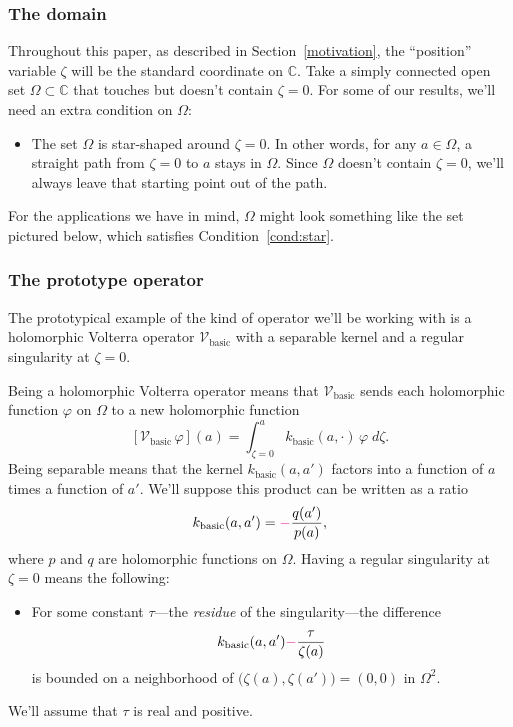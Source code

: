 \documentclass{article}
\makeatletter
\theoremstyle{plain}
\newcommand{\cond}[1]{\item[(\textsc{#1})]\protected@edef\@currentlabel{\textsc{#1}}}
\newcommand{\condconst}[2]{\item[($\text{\textsc{#1}} \mid #2$)]\protected@edef\@currentlabel{$\text{\textsc{#1}} \mid #2$}}
\newcommand{\C}{\mathbb{C}}
\newcommand{\hardpart}{\mathcal{V}_\text{basic}}
\newcommand{\hardker}{k_\text{basic}}
\newcommand{\domain}{\Omega}
\makeatother
\begin{document}
\subsubsection{The domain}\label{setting:domain}
Throughout this paper, as described in Section~\ref{motivation}, the ``position'' variable $\zeta$ will be the standard coordinate on $\C$. Take a simply connected open set $\domain \subset \C$ that touches but doesn't contain $\zeta = 0$. For some of our results, we'll need an extra condition on $\domain$:
\begin{itemize}
\cond{star}\label{cond:star} The set $\domain$ is star-shaped around $\zeta = 0$. In other words, for any $a \in \domain$, a straight path from $\zeta = 0$ to $a$ stays in $\domain$. Since $\domain$ doesn't contain $\zeta = 0$, we'll always leave that starting point out of the path.
\end{itemize}
For the applications we have in mind, $\domain$ might look something like the set pictured below, which satisfies Condition~\eqref{cond:star}.
\begin{center}
\end{center}
\subsubsection{The prototype operator}\label{setting:basic}
The prototypical example of the kind of operator we'll be working with is a holomorphic Volterra operator $\hardpart$ with a separable kernel and a regular singularity at $\zeta = 0$.

Being a holomorphic Volterra operator means that $\hardpart$ sends each holomorphic function $\varphi$ on $\domain$ to a new holomorphic function
\[ [\hardpart\,\varphi](a) = \int_{\zeta = 0}^a \hardker(a, \cdot)\,\varphi\;d\zeta. \]
Being separable means that the kernel $\hardker(a, a')$ factors into a function of $a$ times a function of $a'$. We'll suppose this product can be written as a ratio
\[ \hardker(a, a') = \textcolor{magenta}{-} \frac{q(a')}{p(a)}, \]
where $p$ and $q$ are holomorphic functions on $\domain$. Having a regular singularity at $\zeta = 0$ means the following:
\begin{itemize}
\condconst{sing}{\tau}\label{cond:sing} For some constant $\tau$---the {\em residue} of the singularity---the difference
\[ \hardker(a, a') \textcolor{magenta}{-} \frac{\tau}{\zeta(a)} \]
is bounded on a neighborhood of $\big(\zeta(a), \zeta(a')\big) = (0, 0)$ in $\domain^2$.
\end{itemize}
We'll assume that $\tau$ is real and positive.
\end{document}
